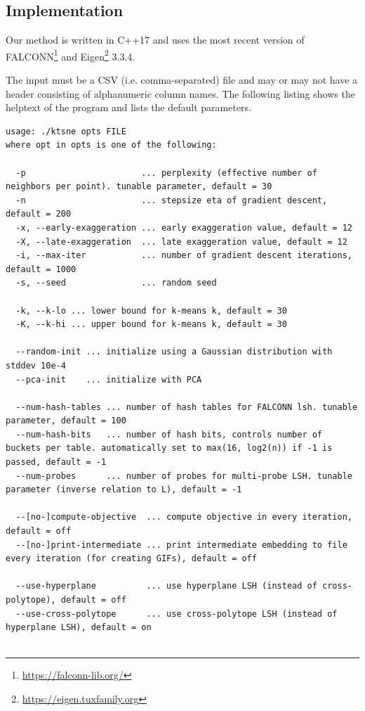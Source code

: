 \begin{appendix}

\chapter{Implementation}\label{ap:a}

Our method is written in C++17 and uses the most recent version of
FALCONN\footnote{\url{https://falconn-lib.org/}} and
Eigen\footnote{\url{https://eigen.tuxfamily.org}} 3.3.4.

The input must be a CSV (i.e. comma-separated) file and may or may not have a header
consisting of alphanumeric column names. The following listing shows the helptext
of the program and lists the default parameters.

\begin{lstlisting}[breaklines,postbreak=\mbox{\textcolor{red}{$\hookrightarrow$}\space}, basicstyle=\ttfamily,caption={Helptext of our implementation}]
usage: ./ktsne opts FILE
where opt in opts is one of the following:

  -p                       ... perplexity (effective number of neighbors per point). tunable parameter, default = 30
  -n                       ... stepsize eta of gradient descent, default = 200
  -x, --early-exaggeration ... early exaggeration value, default = 12
  -X, --late-exaggeration  ... late exaggeration value, default = 12
  -i, --max-iter           ... number of gradient descent iterations, default = 1000
  -s, --seed               ... random seed

  -k, --k-lo ... lower bound for k-means k, default = 30
  -K, --k-hi ... upper bound for k-means k, default = 30

  --random-init ... initialize using a Gaussian distribution with stddev 10e-4
  --pca-init    ... initialize with PCA

  --num-hash-tables ... number of hash tables for FALCONN lsh. tunable parameter, default = 100
  --num-hash-bits   ... number of hash bits, controls number of buckets per table. automatically set to max(16, log2(n)) if -1 is passed, default = -1
  --num-probes      ... number of probes for multi-probe LSH. tunable parameter (inverse relation to L), default = -1

  --[no-]compute-objective  ... compute objective in every iteration, default = off
  --[no-]print-intermediate ... print intermediate embedding to file every iteration (for creating GIFs), default = off

  --use-hyperplane          ... use hyperplane LSH (instead of cross-polytope), default = off
  --use-cross-polytope      ... use cross-polytope LSH (instead of hyperplane LSH), default = on


\end{lstlisting}
\end{appendix}
